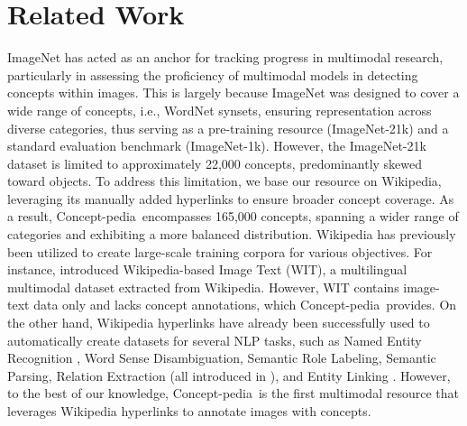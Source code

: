 \documentclass[11pt]{article}
\newcommand{\resource}{Concept-pedia}
\begin{document}
\section{Related Work}
ImageNet has acted as an anchor for tracking progress in multimodal research, particularly in assessing the proficiency of multimodal models in detecting concepts within images. This is largely because ImageNet was designed to cover a wide range of concepts, i.e., WordNet synsets, ensuring representation across diverse categories, thus serving as a pre-training resource (ImageNet-21k) and a standard evaluation benchmark (ImageNet-1k).
However, the ImageNet-21k dataset \cite{ridnik2021imagenet} is limited to approximately 22,000 concepts, predominantly skewed toward objects. 
To address this limitation, we base our resource on Wikipedia, leveraging its manually added hyperlinks to ensure broader concept coverage. As a result, \resource~encompasses 165,000 concepts, spanning a wider range of categories and exhibiting a more balanced distribution.
Wikipedia has previously been utilized to create large-scale training corpora for various objectives.
For instance, \citet{srinivasan2021wit} introduced Wikipedia-based Image Text (WIT), a multilingual multimodal dataset extracted from Wikipedia. However, WIT contains image-text data only and lacks concept annotations, which \resource~provides.
On the other hand, Wikipedia hyperlinks have already been successfully used to automatically create datasets for several NLP tasks, such as Named Entity Recognition \cite{nothman2013learning, al2015polyglot, tsai2016cross, pan2017cross, tedeschi2021wikineural, martinelli-etal-2024-cner}, Word Sense Disambiguation, Semantic Role Labeling, Semantic Parsing, Relation Extraction (all introduced in \citet{conia2024mosaico}), and Entity Linking \cite{wu-etal-2020-scalable}. 
However, to the best of our knowledge, \resource~is the first multimodal resource that leverages Wikipedia hyperlinks to annotate images with concepts.
\end{document}
